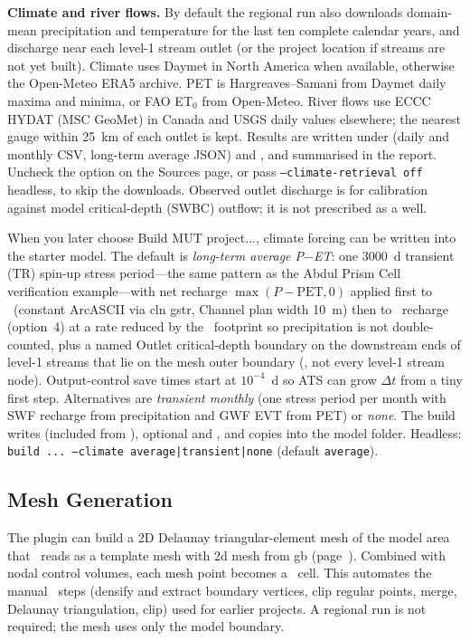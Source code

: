         \textbf{Climate and river flows.}  By default the regional run also downloads domain-mean precipitation and temperature for the last ten complete calendar years, and discharge near each level-1 stream outlet (or the project location if streams are not yet built).  Climate uses Daymet in North America when available, otherwise the Open-Meteo ERA5 archive.  PET is Hargreaves--Samani from Daymet daily maxima and minima, or FAO ET$_0$ from Open-Meteo.  River flows use ECCC HYDAT (MSC GeoMet) in Canada and USGS daily values elsewhere; the nearest gauge within 25~km of each outlet is kept.  Results are written under  (daily and monthly CSV, long-term average JSON) and , and summarised in the report.  Uncheck the option on the Sources page, or pass {\tt --climate-retrieval off} headless, to skip the downloads.  Observed outlet discharge is for calibration against model critical-depth (SWBC) outflow; it is not prescribed as a well.

        When you later choose {\sf Build MUT project...}, climate forcing can be written into the starter model.  The default is {\em long-term average P$-$ET}: one 3000~d transient (TR) spin-up stress period---the same pattern as the Abdul Prism Cell verification example---with net recharge $\max(P-\mathrm{PET},0)$ applied first to \cln\ (constant ArcASCII via {\sf cln gstr}, Channel plan width 10~m) then to \swf\ recharge (option~4) at a rate reduced by the \cln\ footprint so precipitation is not double-counted, plus a named {\sf Outlet} critical-depth boundary on the downstream ends of level-1 streams that lie on the mesh outer boundary (, not every level-1 stream node).  Output-control save times start at $10^{-4}$~d so ATS can grow $\Delta t$ from a tiny first step.  Alternatives are {\em transient monthly} (one stress period per month with SWF recharge from precipitation and GWF EVT from PET) or {\em none}.  The build writes  (included from ), optional  and , and copies  into the model folder.  Headless: {\tt build ... --climate average|transient|none} (default {\tt average}).

    \subsection{Mesh Generation}
        \label{qgis:MeshGeneration} 
        The plugin can build a 2D Delaunay triangular-element mesh of the model area that \mut\ reads as a template mesh with {\sf 2d mesh from gb} (page~\pageref{texfile:TemplateMesh}).  Combined with {\sf nodal control volumes}, each mesh point becomes a \mf\ cell.  This automates the manual \qgis\ steps (densify and extract boundary vertices, clip regular points, merge, Delaunay triangulation, clip) used for earlier projects.  A regional run is not required; the mesh uses only the model boundary.


